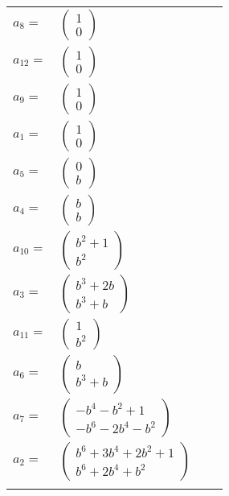 \documentclass[1p]{elsarticle_modified}
\theoremstyle{definition}
\begin{document}
\begin{tabular}{m{7pt} m{180pt} m{7pt} m{180pt} }
\flushright $a_{8}=$&$\begin{pmatrix}1\\0\end{pmatrix}$ \\
\flushright $a_{12}=$&$\begin{pmatrix}1\\0\end{pmatrix}$ \\
\flushright $a_{9}=$&$\begin{pmatrix}1\\0\end{pmatrix}$ \\
\flushright $a_{1}=$&$\begin{pmatrix}1\\0\end{pmatrix}$ \\
\flushright $a_{5}=$&$\begin{pmatrix}0\\b\end{pmatrix}$ \\
\flushright $a_{4}=$&$\begin{pmatrix}b\\b\end{pmatrix}$ \\
\flushright $a_{10}=$&$\begin{pmatrix}b^2+1\\b^2\end{pmatrix}$ \\
\flushright $a_{3}=$&$\begin{pmatrix}b^3+2 b\\b^3+b\end{pmatrix}$ \\
\flushright $a_{11}=$&$\begin{pmatrix}1\\b^2\end{pmatrix}$ \\
\flushright $a_{6}=$&$\begin{pmatrix}b\\b^3+b\end{pmatrix}$ \\
\flushright $a_{7}=$&$\begin{pmatrix}- b^4- b^2+1\\- b^6-2 b^4- b^2\end{pmatrix}$ \\
\flushright $a_{2}=$&$\begin{pmatrix}b^6+3 b^4+2 b^2+1\\b^6+2 b^4+b^2\end{pmatrix}$\\&\end{tabular}
\end{document}
